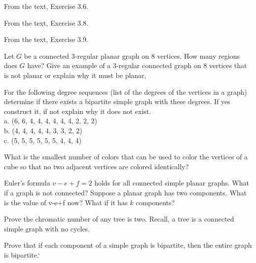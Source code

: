 
\begin{exercise}
From the text, Exercise 3.6.
\end{exercise}

\begin{exercise}
From the text, Exercise 3.8.
\end{exercise}

\begin{exercise}
From the text, Exercise 3.9.
\end{exercise}

\begin{exercise}
Let $G$ be a connected 3-regular planar graph on 8 vertices.  How many regions does $G$ have?  Give an example of a 3-regular connected graph on 8 vertices that is not planar or explain why it must be planar.
\end{exercise}

\begin{exercise}
For the following degree sequences (list of the degrees of the vertices in a graph) determine if there exists a bipartite simple graph with these degrees.  If yes construct it, if not explain why it does not exist.\\
a. (6, 6, 4, 4, 4, 4, 4, 4, 2, 2, 2)\\ b. (4, 4, 4, 4, 4, 3, 3, 2, 2)\\ c. (5, 5, 5, 5, 5, 5, 4, 4, 4)
\end{exercise}


\begin{exercise}
What is the smallest number of colors that can be used to color the vertices of a cube so that no two adjacent vertices are colored identically?
\end{exercise}

\begin{exercise}
 Euler's formula $v-e+f=2$ holds for all connected simple planar graphs. What if a graph is not connected? Suppose a planar graph has two components. What is the value of v-e+f
 now? What if it has $k$ components?
 \end{exercise}

\begin{proofp}
Prove the chromatic number of any tree is two. Recall, a tree is a connected simple  graph with no cycles.
\end{proofp}

\begin{proofp}
Prove that if each component of a simple graph is bipartite, then the entire graph is bipartite.`
\end{proofp}

